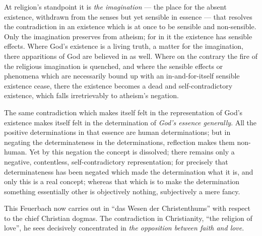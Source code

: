 \documentclass[12pt,a4paper]{book}
\begin{document}
At religion's standpoint it is \emph{the imagination} --- the place for the
absent existence, withdrawn from the senses but yet sensible in essence ---
that resolves the contradiction in an existence which is at once to be
sensible and non-sensible. Only the imagination preserves from atheism; for in
it the existence has sensible effects. Where God's existence is a living
truth, a matter for the imagination, there apparitions of God are believed in
as well. Where on the contrary the fire of the religious imagination is
quenched, and where the sensible effects or phenomena which are necessarily
bound up with an in-and-for-itself sensible existence cease, there the
existence becomes a dead and self-contradictory existence, which falls
irretrievably to atheism's negation.

The same contradiction which makes itself felt in the representation of God's
existence makes itself felt in the determination of \emph{God's essence
generally}. All the positive determinations in that essence are human
determinations; but in negating the determinateness in the determinations,
reflection makes them non-human. Yet by this negation the concept is
dissolved; there remains only a negative, contentless, self-contradictory
representation; for precisely that determinateness has been negated which made
the determination what it is, and only this is a real concept; whereas that
which is to make the determination something essentially other is objectively
nothing, subjectively a mere fancy.

This Feuerbach now carries out in ``das Wesen der Christenthums'' with respect
to the chief Christian dogmas.
The contradiction in Christianity, ``the religion of love'', he sees
decisively concentrated in \emph{the opposition between faith and love}.
\end{document}
